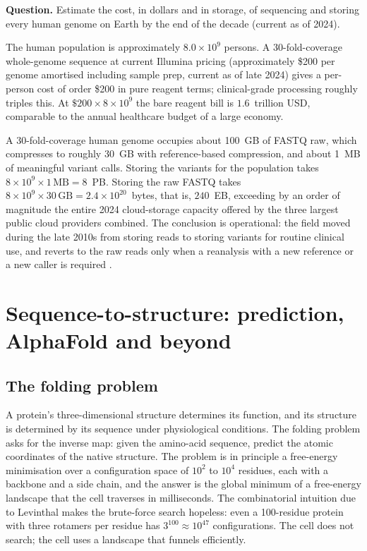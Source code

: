 \begin{estimation}
\textbf{Question.}
Estimate the cost, in dollars and in storage, of sequencing and storing
every human genome on Earth by the end of the decade
(current as of 2024).

The human population is approximately $8.0 \times 10^{9}$ persons. A
30-fold-coverage whole-genome sequence at current Illumina pricing
(approximately \$200 per genome amortised including sample prep, current
as of late 2024) gives a per-person cost of order \$200 in pure reagent
terms; clinical-grade processing roughly triples this. At
$\$200 \times 8 \times 10^{9}$ the bare reagent bill is $1.6$~trillion
USD, comparable to the annual healthcare budget of a large economy.

A 30-fold-coverage human genome occupies about 100~GB of FASTQ raw,
which compresses to roughly 30~GB with reference-based compression, and
about 1~MB of meaningful variant calls. Storing the variants for the
population takes $8 \times 10^{9} \times 1\,\text{MB} = 8$~PB. Storing
the raw FASTQ takes $8 \times 10^{9} \times 30\,\text{GB} = 2.4 \times
10^{20}$~bytes, that is, $240$~EB, exceeding by an order of magnitude
the entire 2024 cloud-storage capacity offered by the three largest
public cloud providers combined. The conclusion is operational: the
field moved during the late 2010s from storing reads to storing
variants for routine clinical use, and reverts to the raw reads only
when a reanalysis with a new reference or a new caller is required
\cite{paper:v6c11-stephens-genomic-2015,paper:v6c11-marx-storage-2013}.
\end{estimation}

\section{Sequence-to-structure: prediction, AlphaFold and beyond}

\subsection{The folding problem}

A protein's three-dimensional structure determines its function, and
its structure is determined by its sequence under physiological
conditions. The folding problem asks for the inverse map: given the
amino-acid sequence, predict the atomic coordinates of the native
structure. The problem is in principle a free-energy minimisation over
a configuration space of $10^{2}$ to $10^{4}$ residues, each with a
backbone and a side chain, and the answer is the global minimum of a
free-energy landscape that the cell traverses in milliseconds. The
combinatorial intuition due to Levinthal makes the brute-force search
hopeless: even a 100-residue protein with three rotamers per residue
has $3^{100} \approx 10^{47}$ configurations. The cell does not search;
the cell uses a landscape that funnels efficiently.

